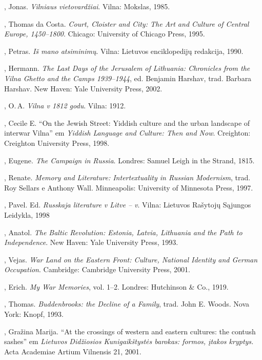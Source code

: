 \begin{bibliohedra}
  , Jonas. \textit{Vilniaus vietovardžiai}. Vilna: Mokslas,
  1985.

  , Thomas da Costa. \textit{Court, Cloister and City: The Art and
  Culture of Central Europe, 1450--1800}. Chicago: University of Chicago
  Press, 1995.

  , Petras. \textit{Iš mano atsiminimų}. Vilna: Lietuvos
  enciklopedijų redakcija, 1990.

  , Hermann. \textit{The Last Days of the Jerusalem of Lithuania:
  Chronicles from the Vilna Ghetto and the Camps 1939--1944}, ed.
  Benjamin Harshav, trad. Barbara Harshav. New Haven: Yale University
  Press, 2002.

  , O.\,A. \textit{Vilna v 1812 godu}. Vilna: 1912.

  , Cecile E. ``On the Jewish Street: Yiddish culture and the
  urban landscape of interwar Vilna'' em \textit{Yiddish Language and
  Culture: Then and Now}. Creighton: Creighton University Press, 1998.

  , Eugene. \textit{The Campaign in Russia}. Londres: Samuel Leigh
  in the Strand, 1815.

  , Renate. \textit{Memory and Literature: Intertextuality in
  Russian Modernism}, trad. Roy Sellars e Anthony Wall. Minneapolis:
  University of Minnesota Press, 1997.

  , Pavel. Ed. \textit{Russkaja literature v Litve -- v}.
  Vilna: Lietuvos Rašytojų Sąjungos Leidykla, 1998

  , Anatol. \textit{The Baltic Revolution: Estonia, Latvia,
  Lithuania and the Path to Independence}. New Haven: Yale University
  Press, 1993.

  , Vejas. \textit{War Land on the Eastern Front: Culture,
  National Identity and German Occupation}. Cambridge: Cambridge
  University Press, 2001.

  , Erich. \textit{My War Memories}, vol. 1--2. Londres:
  Hutchinson \& Co., 1919.

  , Thomas. \textit{Buddenbrooks: the Decline of a Family}, trad. John
  E. Woods. Nova York: Knopf, 1993.

  , Gražina Marija. ``At the crossings of western and
  eastern cultures: the contush sashes'' em \textit{Lietuvos Didžiosios
  Kunigaikštystės barokas: formos, įtakos kryptys.} Acta Academiae
  Artium Vilnensis 21, 2001.


\end{bibliohedra}
